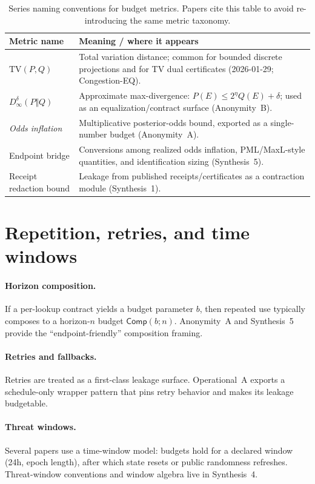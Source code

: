 \documentclass[11pt]{article}
\newcommand{\TV}{\mathrm{TV}}
\begin{document}
\begin{table}[t]
\centering
\begin{tabularx}{\linewidth}{@{}lX@{}}
\toprule
Metric name & Meaning / where it appears \\
\midrule
$\TV(P,Q)$ & Total variation distance; common for bounded discrete projections and for TV dual certificates (2026-01-29; Congestion-EQ).\\
$D_\infty^{\delta}(P\Vert Q)$ & Approximate max-divergence: $P(E)\le 2^{\eta}Q(E)+\delta$; used as an equalization/contract surface (Anonymity~B).\\
\emph{Odds inflation} & Multiplicative posterior-odds bound, exported as a single-number budget (Anonymity~A).\\
Endpoint bridge & Conversions among realized odds inflation, PML/MaxL-style quantities, and identification sizing (Synthesis~5).\\
Receipt redaction bound & Leakage from published receipts/certificates as a contraction module (Synthesis~1).\\
\bottomrule
\end{tabularx}
\caption{Series naming conventions for budget metrics. Papers cite this table to avoid re-introducing the same metric taxonomy.}
\label{tab:metrics}
\end{table}

\section{Repetition, retries, and time windows}
\paragraph{Horizon composition.}
If a per-lookup contract yields a budget parameter $b$, then repeated use typically composes to a horizon-$n$ budget $\mathsf{Comp}(b;n)$.
Anonymity~A and Synthesis~5 provide the ``endpoint-friendly'' composition framing.

\paragraph{Retries and fallbacks.}
Retries are treated as a first-class leakage surface.
Operational~A exports a schedule-only wrapper pattern that pins retry behavior and makes its leakage budgetable.\cite{series:operationalA}

\paragraph{Threat windows.}
Several papers use a time-window model: budgets hold for a declared window (24h, epoch length), after which state resets or public randomness refreshes.
Threat-window conventions and window algebra live in Synthesis~4.\cite{series:threatwindows}
\end{document}
